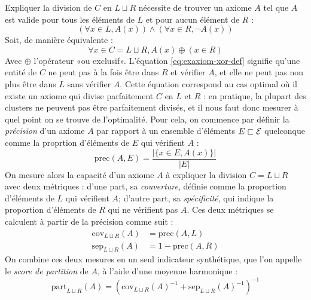 Expliquer la division de $C$ en $L \sqcup R$ nécessite de trouver un axiome $A$ tel que $A$ est valide pour tous les éléments de $L$ et pour aucun élément de $R$ :
\begin{equation}
    \left(\forall x \in L, A(x)  \right) \land \left(\forall x \in R, \neg A(x) \right)
\end{equation}
Soit, de manière équivalente :
\begin{equation}
    \forall x \in C = L \sqcup R, A(x) \oplus (x \in R)
    \label{eq:exaxiom-xor-def}
\end{equation}
Avec $\oplus$ l'opérateur «ou exclusif». L'équation \ref{eq:exaxiom-xor-def} signifie qu'une entité de $C$ ne peut pas à la fois être dans $R$ et vérifier $A$, et elle ne peut pas non plus être dans $L$ sans vérifier $A$. Cette équation correspond au cas optimal où il existe un axiome qui divise parfaitement $C$ en $L$ et $R$ : en pratique, la plupart des clusters ne peuvent pas être parfaitement divisés, et il nous faut donc mesurer à quel point on se trouve de l'optimalité. Pour cela, on commence par définir la \textit{précision} d'un axiome $A$ par rapport à un ensemble d'éléments $E \sqsubset \mathcal{E}$ quelconque comme la proprtion d'éléments de $E$ qui vérifient $A$ :
\begin{equation}
    \text{prec}(A, E) = \frac{|\{ x \in E, A(x)\}|}{| E |}
\end{equation}
On mesure alors la capacité d'un axiome $A$ à expliquer la division $C = L \sqcup R$ avec deux métriques : d'une part, sa \textit{couverture}, définie comme la proportion d'éléments de $L$ qui vérifient $A$; d'autre part, sa \textit{spécificité}, qui indique la proportion d'éléments de $R$ qui ne vérifient pas $A$. Ces deux métriques se calculent à partir de la précision comme suit :
\begin{align}
    \text{cov}_{L \sqcup R}(A) &= \text{prec}(A, L) \\
    \text{sep}_{L \sqcup R}(A) &= 1 - \text{prec}(A, R)
\end{align}
On combine ces deux mesures en un seul indicateur synthétique, que l'on appelle le \textit{score de partition} de $A$, à l'aide d'une moyenne harmonique :
\begin{equation}
    \text{part}_{L \sqcup R}(A) = \left(  \text{cov}_{L \sqcup R}(A)^{-1} + \text{sep}_{L \sqcup R}(A)^{-1} \right)^{-1}
\end{equation}

